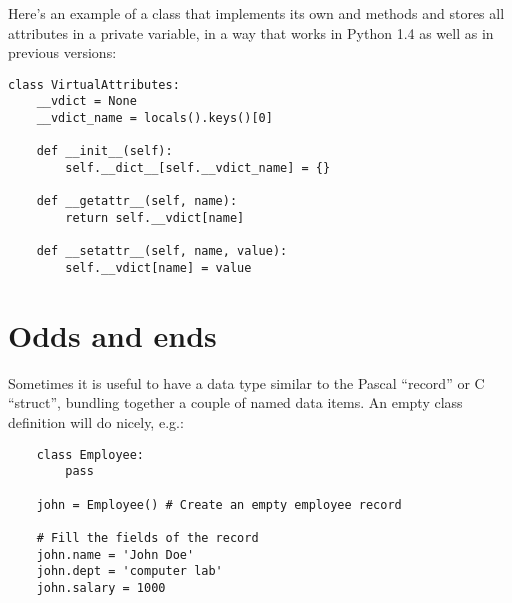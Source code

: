 Here's an example of a class that implements its own
 and  methods and stores all
attributes in a private variable, in a way that works in Python 1.4 as
well as in previous versions:

\begin{verbatim}
class VirtualAttributes:
    __vdict = None
    __vdict_name = locals().keys()[0]
     
    def __init__(self):
        self.__dict__[self.__vdict_name] = {}
    
    def __getattr__(self, name):
        return self.__vdict[name]
    
    def __setattr__(self, name, value):
        self.__vdict[name] = value
\end{verbatim}


\section{Odds and ends}

Sometimes it is useful to have a data type similar to the Pascal
``record'' or C ``struct'', bundling together a couple of named data
items.  An empty class definition will do nicely, e.g.:

\begin{verbatim}
    class Employee:
        pass

    john = Employee() # Create an empty employee record

    # Fill the fields of the record
    john.name = 'John Doe'
    john.dept = 'computer lab'
    john.salary = 1000
\end{verbatim}


